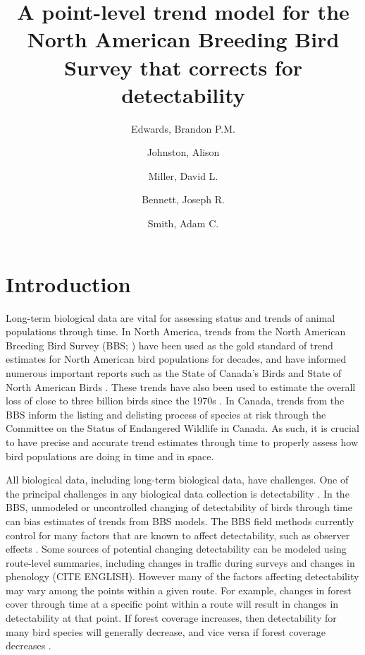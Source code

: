 \documentclass[12pt]{article}
\title{A point-level trend model for the North American Breeding Bird Survey that corrects for detectability}
\author{
	Edwards, Brandon P.M.\\
	\and
	Johnston, Alison\\
	\and
	Miller, David L.\\
	\and
	Bennett, Joseph R.\\
	\and
	Smith, Adam C.\\
}
\begin{document}
	
	\maketitle
	
	
	
\section{Introduction}

\par Long-term biological data are vital for assessing status and trends of animal populations through time.
In North America, trends from the North American Breeding Bird Survey (BBS; \citet{sauer_first_2017, hudson_role_2017}) have been used as the gold standard of trend estimates for North American bird populations for decades, and have informed numerous important reports such as the State of Canada's Birds \citep{north_american_bird_conservation_initiative_canada_state_2019} and State of North American Birds \citep{north_american_bird_conservation_initiative_canada_state_2022}.
These trends have also been used to estimate the overall loss of close to three billion birds since the 1970s \citep{rosenberg_decline_2019}.
In Canada, trends from the BBS inform the listing and delisting process of species at risk through the Committee on the Status of Endangered Wildlife in Canada.
As such, it is crucial to have precise and accurate trend estimates through time to properly assess how bird populations are doing in time and in space.

\par All biological data, including long-term biological data, have challenges. 
One of the principal challenges in any biological data collection is detectability \citep{bennett_how_2024}.
In the BBS, unmodeled or uncontrolled changing of detectability of birds through time can bias estimates of trends from BBS models.
The BBS field methods currently control for many factors that are known to affect detectability, such as observer effects \citet{sauer_observer_1994}.
Some sources of potential changing detectability can be modeled using route-level summaries, including changes in traffic during surveys \citep{griffith_traffic_2010} and changes in phenology (CITE ENGLISH).
However many of the factors affecting detectability may vary among the points within a given route.
For example, changes in forest cover through time at a specific point within a route will result in changes in detectability at that point.
If forest coverage increases, then detectability for many bird species will generally decrease, and vice versa if forest coverage decreases \citep{edwards_point_2023, yip_sound_2017}.
\end{document}
